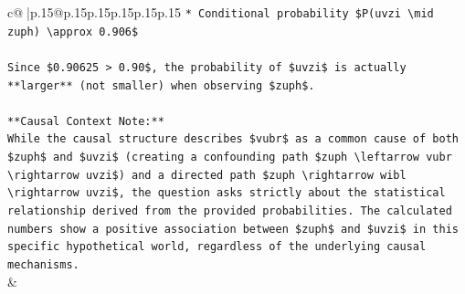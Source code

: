 \documentclass{article}
\begin{document}
{\begin{supertabular}{c@{$\;$}|p{.15\linewidth}@{}p{.15\linewidth}p{.15\linewidth}p{.15\linewidth}p{.15\linewidth}p{.15\linewidth}}
{{{\texttt{*   Conditional probability \$P(uvzi \textbackslash{}mid zuph) \textbackslash{}approx 0.906\$} \\
\\ 
\texttt{Since \$0.90625 > 0.90\$, the probability of \$uvzi\$ is actually **larger** (not smaller) when observing \$zuph\$.} \\
\\ 
\texttt{**Causal Context Note:**} \\
\texttt{While the causal structure describes \$vubr\$ as a common cause of both \$zuph\$ and \$uvzi\$ (creating a confounding path \$zuph \textbackslash{}leftarrow vubr \textbackslash{}rightarrow uvzi\$) and a directed path \$zuph \textbackslash{}rightarrow wibl \textbackslash{}rightarrow uvzi\$, the question asks strictly about the statistical relationship derived from the provided probabilities. The calculated numbers show a positive association between \$zuph\$ and \$uvzi\$ in this specific hypothetical world, regardless of the underlying causal mechanisms.} \\
            }
        }
    }
    & \\ \\


\end{supertabular}}
\end{document}
